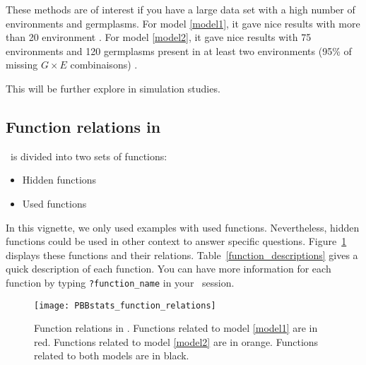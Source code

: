 These methods are of interest if you have a large data set with a high number of environments and germplasms.
For model \ref{model1}, it gave nice results with more than 20 environment \citep{riviere_hierarchical_2015}.
For model \ref{model2}, it gave nice results with 75 environments and 120 germplasms present in at least two environments (95\% of missing $G \times E$ combinaisons) \citep{riviere_hierarchical_2016}.

This will be further explore in simulation studies.

\subsection{Function relations in \pack}

\pack~is divided into two sets of functions:


\begin{itemize}
\item Hidden functions
\item Used functions
\end{itemize}


In this vignette, we only used examples with used functions.
Nevertheless, hidden functions could be used in other context to answer specific questions.
Figure~\ref{function_relations} displays these functions and their relations.
Table~\ref{function_descriptions} gives a quick description of each function.
You can have more information for each function by typing \texttt{?function\_name} in your \R~session.


\begin{figure}[H]
\begin{center}
\texttt{[image: PBBstats\_function\_relations]}
\end{center}
\caption{Function relations in \pack.
Functions related to model \ref{model1} are in red.
Functions related to model \ref{model2} are in orange.
Functions related to both models are in black.
}
\label{function_relations}
\end{figure}

